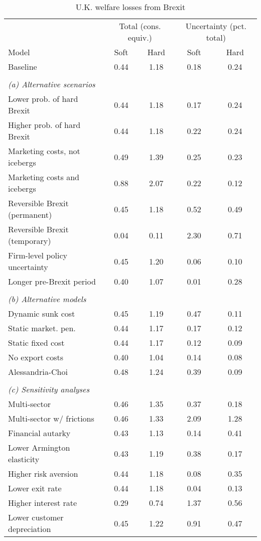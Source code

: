 \begin{table}[h!]
\renewcommand{\arraystretch}{1.2}
\begin{center}
\caption{U.K. welfare losses from Brexit}
\label{tab:results-welfare}
\begin{tabular}{lcccc}\toprule
&\multicolumn{2}{c}{Total (cons. equiv.)}&\multicolumn{2}{c}{Uncertainty (pct. total)}\\
\cmidrule(rl){2-3}\cmidrule(rl){4-5}
Model&\multicolumn{1}{p{1.5cm}}{\centering Soft}&\multicolumn{1}{p{1.5cm}}{\centering Hard}&\multicolumn{1}{p{1.5cm}}{\centering Soft}&\multicolumn{1}{p{1.5cm}}{\centering Hard}\\
\midrule
Baseline&0.44&1.18&0.18&0.24\\
\\
\multicolumn{5}{l}{\textit{(a) Alternative scenarios}}\\
Lower prob. of hard Brexit&0.44&1.18&0.17&0.24\\
Higher prob. of hard Brexit&0.44&1.18&0.22&0.24\\
Marketing costs, not icebergs&0.49&1.39&0.25&0.23\\
Marketing costs and icebergs&0.88&2.07&0.22&0.12\\
Reversible Brexit (permanent)&0.45&1.18&0.52&0.49\\
Reversible Brexit (temporary)&0.04&0.11&2.30&0.71\\
Firm-level policy uncertainty&0.45&1.20&0.06&0.10\\
Longer pre-Brexit period&0.40&1.07&0.01&0.28\\
\\
\multicolumn{5}{l}{\textit{(b) Alternative models}}\\
Dynamic sunk cost&0.45&1.19&0.47&0.11\\
Static market. pen.&0.44&1.17&0.17&0.12\\
Static fixed cost&0.44&1.17&0.12&0.09\\
No export costs&0.40&1.04&0.14&0.08\\
Alessandria-Choi&0.48&1.24&0.39&0.09\\
\\
\multicolumn{5}{l}{\textit{(c) Sensitivity analyses}}\\
Multi-sector&0.46&1.35&0.37&0.18\\
Multi-sector w/ frictions&0.46&1.33&2.09&1.28\\
Financial autarky&0.43&1.13&0.14&0.41\\
Lower Armington elasticity&0.43&1.19&0.38&0.17\\
Higher risk aversion&0.44&1.18&0.08&0.35\\
Lower exit rate&0.44&1.18&0.04&0.13\\
Higher interest rate&0.29&0.74&1.37&0.56\\
Lower customer depreciation&0.45&1.22&0.91&0.47\\
\bottomrule
\end{tabular}
\end{center}
\end{table}
